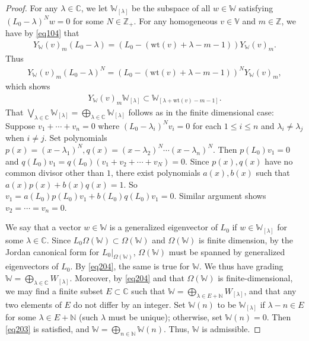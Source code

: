 \documentclass[12pt,a4paper,notitlepage]{report}
\theoremstyle{definition}
\theoremstyle{plain}
\newcommand{\Vbb}{\mathbb V}
\newcommand{\Wbb}{\mathbb W}
\newcommand{\Cbb}{\mathbb C}
\newcommand{\Nbb}{\mathbb N}
\newcommand{\Zbb}{\mathbb Z}
\newcommand{\wt}{\mathrm{wt}}
\numberwithin{equation}{section}
\begin{document}
\begin{proof}
For any $\lambda\in\Cbb$, we let $\Wbb_{[\lambda]}$ be the subspace of all $w\in \Wbb$ satisfying $(L_0-\lambda)^Nw=0$ for some $N\in\Zbb_+$. For any homogeneous $v\in\Vbb$ and $m\in\Zbb$, we have by \eqref{eq104} that
\begin{align*}
Y_\Wbb(v)_m(L_0-\lambda)=(L_0-(\wt(v)+\lambda-m-1))Y_\Wbb(v)_m.
\end{align*}
Thus
\begin{align}
Y_\Wbb(v)_m(L_0-\lambda)^N=(L_0-(\wt(v)+\lambda-m-1))^NY_\Wbb(v)_m,
\end{align}
which shows 
\begin{align}
Y_\Wbb(v)_m\Wbb_{[\lambda]}\subset\Wbb_{[\lambda+\wt(v)-m-1]}.\label{eq204}
\end{align}
That $\bigvee_{\lambda\in\Cbb}\Wbb_{[\lambda]}=\bigoplus_{\lambda\in\Cbb}\Wbb_{[\lambda]}$ follows as in the finite dimensional case: Suppose  $v_1+\cdots+v_n=0$ where $(L_0-\lambda_i)^Nv_i=0$ for each $1\leq i\leq n$ and $\lambda_i\neq \lambda_j$ when $i\neq j$. Set polynomials $p(x)=(x-\lambda_1)^N,q(x)=(x-\lambda_2)^N\cdots(x-\lambda_n)^N$. Then $p(L_0)v_1=0$ and $q(L_0)v_1=q(L_0)(v_1+v_2+\cdots+v_N)=0$. Since $p(x),q(x)$ have no common divisor other than $1$, there exist polynomials $a(x),b(x)$ such that $a(x)p(x)+b(x)q(x)=1$. So $v_1=a(L_0)p(L_0)v_1+b(L_0)q(L_0)v_1=0$. Similar argument shows $v_2=\cdots=v_n=0$.





We say that a vector $w\in\Wbb$ is a generalized eigenvector of $L_0$ if $w\in\Wbb_{[\lambda]}$ for some $\lambda\in\Cbb$. Since $L_0\Omega(\Wbb)\subset\Omega(\Wbb)$ and $\Omega(\Wbb)$ is finite dimension, by the Jordan canonical form for $L_0|_{\Omega(\Wbb)}$,  $\Omega(\Wbb)$ must be spanned by generalized eigenvectors of $L_0$. By \eqref{eq204}, the same is true for $\Wbb$. We thus have grading $\Wbb=\bigoplus_{\lambda\in\Cbb}W_{[\lambda]}$. Moreover, by \eqref{eq204} and that $\Omega(\Wbb)$ is finite-dimensional, we may find a finite subset $E\subset\Cbb$ such that $\Wbb=\bigoplus_{\lambda\in E+\Nbb}W_{[\lambda]}$, and that any two elements of $E$ do not differ by an integer.  Set $\Wbb(n)$ to be $\Wbb_{[\lambda]}$ if $\lambda-n\in E$ for some $\lambda\in E+\Nbb$ (such $\lambda$ must be unique); otherwise, set $\Wbb(n)=0$. Then \eqref{eq203} is satisfied, and $\Wbb=\bigoplus_{n\in\Nbb}\Wbb(n)$. Thus, $\Wbb$ is admissible.
\end{proof}
\end{document}
